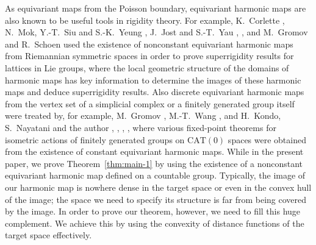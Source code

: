 \documentclass[12pt]{amsart}
\numberwithin{equation}{section}
\theoremstyle{plain}
\theoremstyle{definition}
\theoremstyle{remark}
\newcommand{\cat}[1]{\mathrm{CAT}(#1)}
\begin{document}
As equivariant maps from the Poisson boundary, equivariant harmonic
maps are also known to be useful tools in rigidity theory. 
For example, K.~Corlette \cite{corlette}, 
N.~Mok, Y.-T.~Siu and S.-K.~Yeung \cite{mok-siu-yeung}, 
J.~Jost and S.-T.~Yau \cite{jost-yau1}, \cite{jost-yau2}, and 
M.~Gromov and R.~Schoen \cite{gromov-schoen} used the existence
of nonconstant equivariant harmonic maps from Riemannian symmetric
spaces in order to prove superrigidity results for lattices in Lie
groups, where the local geometric structure of the domains of harmonic
maps has key information to determine the images of these harmonic
maps and deduce superrigidity results. 
Also discrete equivariant harmonic maps from the vertex set of a
simplicial complex or a finitely generated group itself were 
treated by,
for example, M.~Gromov \cite{gromov}, M.-T.~Wang \cite{wang}, and 
H.~Kondo, S.~Nayatani and the author \cite{izeki-nayatani},
\cite{izeki-kondo-nayatani1}, \cite{izeki-kondo-nayatani2},
\cite{izeki}, where various fixed-point theorems for isometric actions
of finitely generated groups on $\cat{0}$ spaces were obtained from the
existence of constant equivariant harmonic maps. 
While in the present paper, we prove Theorem~\ref{thm:main-1} by using
the existence of a nonconstant equivariant harmonic map defined on a
countable group. 
Typically, the image of our harmonic map is nowhere dense in the
target space or even in the convex hull of the image; the space we need
to specify its structure is far from being covered by the image. 
In order to prove our theorem, however, we need to fill this huge
complement. 
We achieve this by using the convexity of distance
functions of the target space effectively. 
\end{document}
